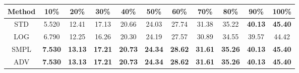 \documentclass{standalone}
\begin{document}
\begin{tabular}{c|cccccccccc}
      \toprule
      Method & 10\% & 20\% & 30\% & 40\% & 50\% & 60\% & 70\% & 80\% & 90\% & 100\% \\
      \midrule
STD & 5.520 & 12.41 & 17.13 & 20.66 & 24.03 & 27.74 & 31.38 & 35.22 & \textbf{40.13} & \textbf{45.40}\\
LOG & 6.790 & 12.25 & 16.26 & 20.30 & 24.19 & 27.57 & 30.89 & 34.55 & 39.57 & 44.42\\
SMPL & \textbf{7.530} & \textbf{13.13} & \textbf{17.21} & \textbf{20.73} & \textbf{24.34} & \textbf{28.62} & \textbf{31.61} & \textbf{35.26} & \textbf{40.13} & \textbf{45.40}\\
ADV & \textbf{7.530} & \textbf{13.13} & \textbf{17.21} & \textbf{20.73} & \textbf{24.34} & \textbf{28.62} & \textbf{31.61} & \textbf{35.26} & \textbf{40.13} & \textbf{45.40}\\
  \bottomrule
\end{tabular}
\end{document}
